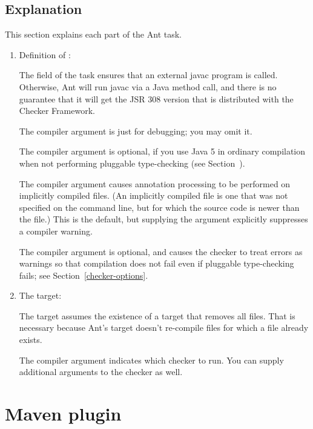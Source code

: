 \subsection{Explanation\label{ant-task-explanation}}

This section explains each part of the Ant task.

\begin{enumerate}
\item Definition of :

The  field of the  task
ensures that an external javac program is called.  Otherwise, Ant will run
javac via a Java method call, and there is no guarantee that it will get
the JSR 308 version that is distributed with the Checker Framework.

The  compiler argument is just for debugging; you may omit
it.

The  compiler argument is optional, if you use Java 5 in
ordinary compilation when not performing pluggable type-checking (see
Section~).

The  compiler argument causes annotation processing
to be performed on implicitly compiled files.  (An implicitly compiled file
is one that was not specified on the command line, but for which the source
code is newer than the  file.)  This is the default, but
supplying the argument explicitly suppresses a compiler warning.

The  compiler argument is optional, and causes the checker to
treat errors as warnings so that compilation does not fail even if
pluggable type-checking fails; see Section~\ref{checker-options}.

\item The  target:

The target assumes the existence of a  target that removes all
 files.  That is necessary because Ant's  target
doesn't re-compile  files for which a  file
already exists.

The  compiler argument indicates which checker to
run.  You can supply additional arguments to the checker as well.

\end{enumerate}


\section{Maven plugin\label{maven-plugin}}

